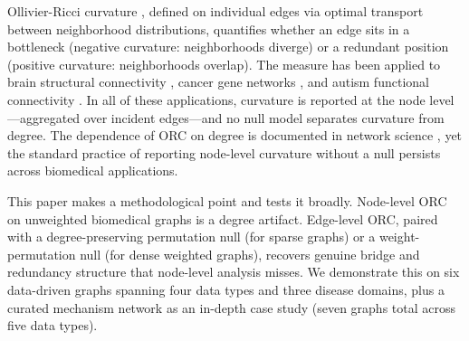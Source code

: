 \documentclass[11pt]{article}
\begin{document}
Ollivier-Ricci curvature \citep{ollivier2009ricci}, defined on individual edges via optimal transport between neighborhood distributions, quantifies whether an edge sits in a bottleneck (negative curvature: neighborhoods diverge) or a redundant position (positive curvature: neighborhoods overlap). The measure has been applied to brain structural connectivity \citep{farooq2019network}, cancer gene networks \citep{sandhu2015graph}, and autism functional connectivity \citep{simhal2020measuring, elumalai2022graph}. In all of these applications, curvature is reported at the node level---aggregated over incident edges---and no null model separates curvature from degree. The dependence of ORC on degree is documented in network science \citep{ni2015ricci}, yet the standard practice of reporting node-level curvature without a null persists across biomedical applications.

This paper makes a methodological point and tests it broadly. Node-level ORC on unweighted biomedical graphs is a degree artifact. Edge-level ORC, paired with a degree-preserving permutation null (for sparse graphs) or a weight-permutation null (for dense weighted graphs), recovers genuine bridge and redundancy structure that node-level analysis misses. We demonstrate this on six data-driven graphs spanning four data types and three disease domains, plus a curated mechanism network as an in-depth case study (seven graphs total across five data types).
\end{document}
